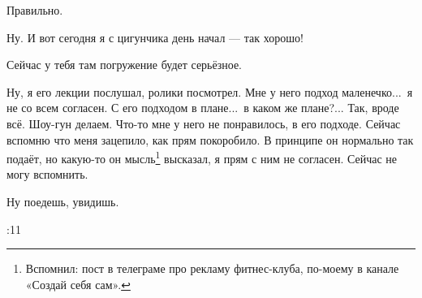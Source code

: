 \M
Правильно.

\I
Ну. И вот сегодня я с цигунчика день начал --- так хорошо!

\M
Сейчас у тебя там погружение будет серьёзное.

\I
Ну, я его лекции послушал, ролики посмотрел.
Мне у него подход маленечко...\ я не со всем согласен.
С его подходом в плане...\ в каком же плане?...
Так, вроде всё. Шоу-гун делаем.
Что-то мне у него не понравилось, в его подходе.
Сейчас вспомню что меня зацепило, как прям покоробило.
В принципе он нормально так подаёт, но какую-то он мысль\footnote*{Вспомнил:
пост в телеграме про рекламу фитнес-клуба, по-моему в канале «Создай себя сам».}
высказал, я прям с ним не согласен.
Сейчас не могу вспомнить.

\M
Ну поедешь, увидишь.

:11

